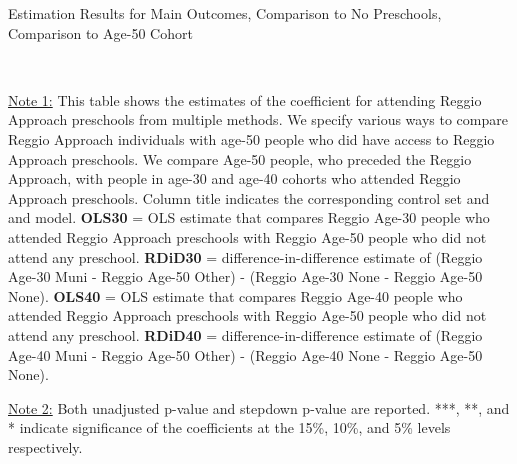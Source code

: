\begin{table}[H] \caption{Estimation Results for Main Outcomes, Comparison to No Preschools, Comparison to Age-50 Cohort} \label{ols-M-adult50-reg-nopres}
\scalebox{0.56}{}
\vspace{1ex} \\
\footnotesize\raggedright{\underline{Note 1:} This table shows the estimates of the coefficient for attending Reggio Approach preschools from multiple methods. We specify various ways to compare Reggio Approach individuals with age-50 people who did have access to Reggio Approach preschools. We compare Age-50 people, who preceded the Reggio Approach, with people in age-30 and age-40 cohorts who attended Reggio Approach preschools. Column title indicates the corresponding control set and and model. \textbf{OLS30} = OLS estimate that compares Reggio Age-30 people who attended Reggio Approach preschools with Reggio Age-50 people who did not attend any preschool.  \textbf{RDiD30} = difference-in-difference estimate of (Reggio Age-30 Muni - Reggio Age-50 Other) - (Reggio Age-30 None - Reggio Age-50 None). \textbf{OLS40} = OLS estimate that compares Reggio Age-40 people who attended Reggio Approach preschools with Reggio Age-50 people who did not attend any preschool.  \textbf{RDiD40} = difference-in-difference estimate of (Reggio Age-40 Muni - Reggio Age-50 Other) - (Reggio Age-40 None - Reggio Age-50 None). } 

\footnotesize\raggedright{\underline{Note 2:} Both unadjusted p-value and stepdown p-value are reported. ***, **, and * indicate significance of the coefficients at the 15\%, 10\%, and 5\% levels respectively.}
\end{table}

